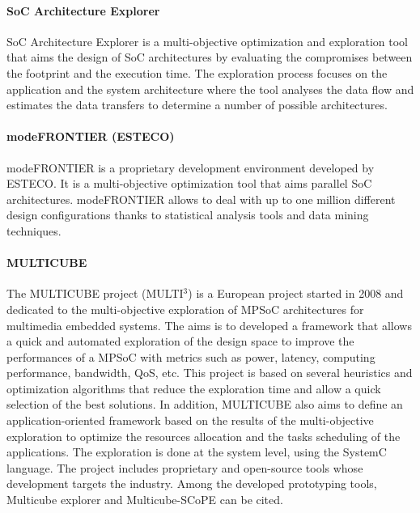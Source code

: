 \paragraph{SoC Architecture Explorer}

SoC Architecture Explorer \cite{ueda05architecture} is a multi-objective optimization and exploration tool that aims the design of SoC architectures by evaluating the compromises between the footprint and the execution time. The exploration process focuses on the application and the system architecture where the tool analyses the data flow and estimates the data transfers to determine a number of possible architectures.

\paragraph{modeFRONTIER (ESTECO)}

modeFRONTIER \cite{esteco01} is a proprietary development environment developed by ESTECO. It is a multi-objective optimization tool that aims parallel SoC architectures. modeFRONTIER allows to deal with up to one million different design configurations thanks to statistical analysis tools and data mining techniques.

\paragraph{MULTICUBE}

The MULTICUBE project (MULTI$^{3}$) \cite{multicube08, Silvanoetal09} is a European project started in 2008 and dedicated to the multi-objective exploration of MPSoC architectures for multimedia embedded systems. The aims is to developed a framework that allows a quick and automated exploration of the design space to improve the performances of a MPSoC with metrics such as power, latency, computing performance, bandwidth, QoS, etc. This project is based on several heuristics and optimization algorithms that reduce the exploration time and allow a quick selection of the best solutions. In addition, MULTICUBE also aims to define an application-oriented framework based on the results of the multi-objective exploration to optimize the resources allocation and the tasks scheduling of the applications. The exploration is done at the system level, using the SystemC language. The project includes proprietary and open-source tools whose development targets the industry. Among the developed prototyping tools, Multicube explorer and Multicube-SCoPE can be cited.

